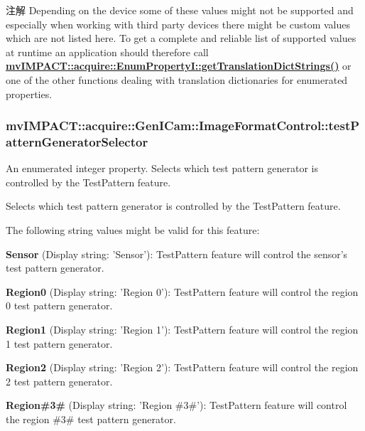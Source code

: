 \begin{DoxyNote}{注解}
Depending on the device some of these values might not be supported and especially when working with third party devices there might be custom values which are not listed here. To get a complete and reliable list of supported values at runtime an application should therefore call {\bfseries \hyperlink{classmv_i_m_p_a_c_t_1_1acquire_1_1_enum_property_i_a0ba6ccbf5ee69784d5d0b537924d26b6}{mv\+I\+M\+P\+A\+C\+T\+::acquire\+::\+Enum\+Property\+I\+::get\+Translation\+Dict\+Strings()}} or one of the other functions dealing with translation dictionaries for enumerated properties. 
\end{DoxyNote}
\hypertarget{classmv_i_m_p_a_c_t_1_1acquire_1_1_gen_i_cam_1_1_image_format_control_af1008e10eaea4f9fe5a93410883543de}{
\subsubsection[{test\+Pattern\+Generator\+Selector}]{ mv\+I\+M\+P\+A\+C\+T\+::acquire\+::\+Gen\+I\+Cam\+::\+Image\+Format\+Control\+::test\+Pattern\+Generator\+Selector}}\label{classmv_i_m_p_a_c_t_1_1acquire_1_1_gen_i_cam_1_1_image_format_control_af1008e10eaea4f9fe5a93410883543de}


An enumerated integer property. Selects which test pattern generator is controlled by the Test\+Pattern feature. 

Selects which test pattern generator is controlled by the Test\+Pattern feature.

The following string values might be valid for this feature\+:
\begin{DoxyItemize}
\item {\bfseries Sensor} (Display string\+: 'Sensor')\+: Test\+Pattern feature will control the sensor's test pattern generator.
\item {\bfseries Region0} (Display string\+: 'Region 0')\+: Test\+Pattern feature will control the region 0 test pattern generator.
\item {\bfseries Region1} (Display string\+: 'Region 1')\+: Test\+Pattern feature will control the region 1 test pattern generator.
\item {\bfseries Region2} (Display string\+: 'Region 2')\+: Test\+Pattern feature will control the region 2 test pattern generator.
\item {\bfseries Region\#3\#} (Display string\+: 'Region \#3\#')\+: Test\+Pattern feature will control the region \#3\# test pattern generator.
\end{DoxyItemize}

